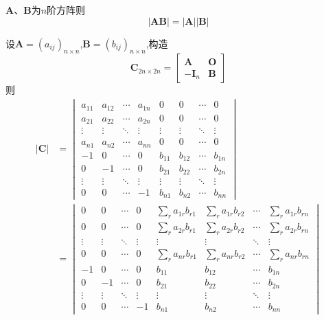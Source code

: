 \begin{formal}
\begin{theorem}[方阵积的行列式]\label{thm:方阵积的行列式}
    $\bm{A}$、$\bm{B}$为$n$阶方阵则
    \[
    \left|\bm{AB}\right|=\left|\bm{A}\right|\left|\bm{B}\right|
    \]
\end{theorem}
\begin{Proof}
设$\bm{A}=\left(a_{ij}\right)_{n \times n}$,$\bm{B} = 
\left(b_{ij}\right)_{n \times n}$,构造
\[
\bm{C}_{2n \times 2n}=\begin{bmatrix}
    \bm{A}&\bm{O}\\
    -\bm{I}_n&\bm{B}
\end{bmatrix}
\]
则
\begin{align*}
 \left|\bm{C}\right|   &=
 \begin{vmatrix}
    a_{11}&a_{12}&\cdots&a_{1n}&0&0&\cdots&0\\
    a_{21}&a_{22}&\cdots&a_{2n}&0&0&\cdots&0\\
    \vdots&\vdots&\ddots&\vdots&\vdots&\vdots&\ddots&\vdots\\
    a_{n1}&a_{n2}&\cdots&a_{nn}&0&0&\cdots&0\\
    -1&0&\cdots&0&b_{11}&b_{12}&\cdots&b_{1n}\\
    0&-1&\cdots&0&b_{21}&b_{22}&\cdots&b_{2n}\\
    \vdots&\vdots&\ddots&\vdots&\vdots&\vdots&\ddots&\vdots\\
    0&0&\cdots&-1&b_{n1}&b_{n2}&\cdots&b_{nn}
 \end{vmatrix}\\
 &=
 \begin{vmatrix}
    0&0&\cdots&0&\sum\limits_{r}a_{1r}b_{r1}&\sum\limits_{r}a_{1r}b_{r2}&\cdots&\sum\limits_{r}a_{1r}b_{rn}\\
    0&0&\cdots&0&\sum\limits_{r}a_{2r}b_{r1}&\sum\limits_{r}a_{2r}b_{r2}&\cdots&\sum\limits_{r}a_{2r}b_{rn}\\
    \vdots&\vdots&\ddots&\vdots&\vdots&\vdots&\ddots&\vdots\\
    0&0&\cdots&0&\sum\limits_{r}a_{nr}b_{r1}&\sum\limits_{r}a_{nr}b_{r2}&\cdots&\sum\limits_{r}a_{nr}b_{rn}\\
    -1&0&\cdots&0&b_{11}&b_{12}&\cdots&b_{1n}\\
    0&-1&\cdots&0&b_{21}&b_{22}&\cdots&b_{2n}\\
    \vdots&\vdots&\ddots&\vdots&\vdots&\vdots&\ddots&\vdots\\
    0&0&\cdots&-1&b_{n1}&b_{n2}&\cdots&b_{nn}
 \end{vmatrix}\\

\end{align*}
\end{Proof}
\end{formal}

